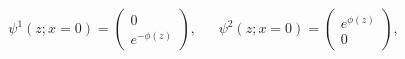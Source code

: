 \begin{equation}
\psi^1(z;x=0)=
\left(\begin{array}{cr}
0\\e^{-\phi(z)}\end{array}\right),~~~~~~~
\psi^2(z;x=0)=
\left(\begin{array}{cr}
e^{\phi(z)}\\
0
\end{array}\right),
\end{equation}

